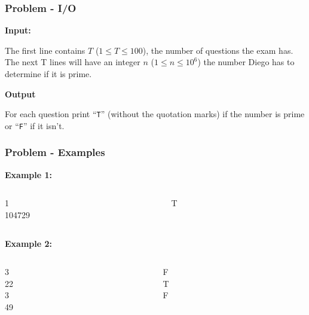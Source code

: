 \documentclass{beamer}
\begin{document}
\begin{frame}
    \frametitle{Problem - I/O}

    \textbf{Input:}

    The first line contains $T$ ($1 \leq T \leq 100$), the number of questions the exam has. The next T lines will have an integer $n$ ($1 \leq n \leq 10^6$) the number Diego has to determine if it is prime.

    \textbf{Output}

    For each question print ``\texttt{T}'' (without the quotation marks) if the number is prime or ``\texttt{F}'' if it isn’t.

\end{frame}

\begin{frame}
    \frametitle{Problem - Examples}

    \textbf{Example 1:}
    \vspace{2mm}
    \begin{columns}
        \begin{column}{0.3\textwidth}
            \begin{tcolorbox}[fonttitle=\bfseries, title=Input]
                1\\
                104729
            \end{tcolorbox}
        \end{column}
        \begin{column}{0.3\textwidth}
            \begin{tcolorbox}[fonttitle=\bfseries, title=Output]
                T\\
            \end{tcolorbox}
        \end{column}
    \end{columns}

    \vspace{4mm}

    \textbf{Example 2:}
    \vspace{2mm}
    \begin{columns}
        \begin{column}{0.3\textwidth}
            \begin{tcolorbox}[fonttitle=\bfseries, title=Input]
                3\\
                22\\
                3\\
                49
            \end{tcolorbox}
        \end{column}
        \begin{column}{0.3\textwidth}
            \begin{tcolorbox}[fonttitle=\bfseries, title=Output]
                F\\
                T\\
                F\\
            \end{tcolorbox}
        \end{column}
    \end{columns}
\end{frame}
\end{document}
